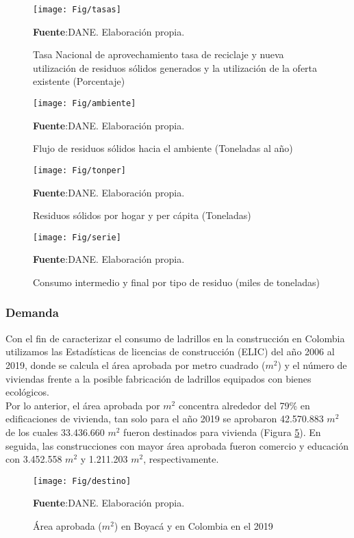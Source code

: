 \documentclass[12pt]{article}
\begin{document}
\begin{figure}[H]
  	\centering 		
  	\caption{ Tasa Nacional de aprovechamiento tasa de reciclaje y nueva utilización de residuos sólidos generados y la utilización de la oferta existente (Porcentaje)}
	\texttt{[image: Fig/tasas]}
\raggedright  \scriptsize \textbf{Fuente}:DANE. Elaboración propia.
	\label{2}	
	\end{figure}
	
	
	\begin{figure}[H]
  	\centering 		
  	\caption{Flujo de residuos sólidos hacia el ambiente (Toneladas al año)}
	\texttt{[image: Fig/ambiente]}
\raggedright  \scriptsize \textbf{Fuente}:DANE. Elaboración propia.
	\label{2}	
	\end{figure}
	
	\begin{figure}[H]
  	\centering 		
  	\caption{Residuos sólidos por hogar y per cápita (Toneladas)}
	\texttt{[image: Fig/tonper]}
\raggedright  \scriptsize \textbf{Fuente}:DANE. Elaboración propia.
	\label{2}	
	\end{figure}
	
		\begin{figure}[H]
  	\centering 		
  	\caption{Consumo intermedio y final por tipo de residuo (miles de toneladas)}
	\texttt{[image: Fig/serie]}
\raggedright  \scriptsize \textbf{Fuente}:DANE. Elaboración propia.
	\label{2}	
	\end{figure}
	
	
\subsubsection{Demanda} 
Con el fin de caracterizar el consumo de ladrillos en la construcción en Colombia utilizamos las Estadísticas de licencias de construcción (ELIC) del año 2006 al 2019, donde se calcula el área aprobada por metro cuadrado ($m^2$) y el número de viviendas frente a la posible fabricación de ladrillos equipados con bienes ecológicos.\\

Por lo anterior, el área aprobada por $m^2$ concentra alrededor del 79\% en edificaciones de vivienda, tan solo para el año 2019 se aprobaron 42.570.883 $m^2$ de los cuales 33.436.660 $m^2$ fueron destinados para vivienda (Figura \ref{3}). En seguida, las construcciones con mayor área aprobada fueron comercio y educación con 3.452.558 $m^2$ y 1.211.203 $m^2$, respectivamente.
\begin{figure}[H]
  	\centering 		
  	\caption{Área aprobada ($m^2$) en Boyacá y en Colombia en el 2019}
	\texttt{[image: Fig/destino]}
\raggedright  \scriptsize \textbf{Fuente}:DANE. Elaboración propia.
	\label{3}	
	\end{figure}
\end{document}
